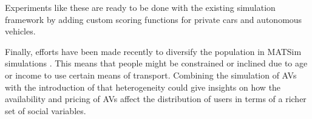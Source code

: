 Experiments like these are ready to be done with the existing simulation framework
by adding custom scoring functions for private cars and autonomous vehicles.

Finally, efforts have been made recently to diversify the population in MATSim simulations \citep{Chakirov2015}.
This means that people might be constrained or inclined due to age or income to use certain means
of transport. Combining the simulation of AVs with the introduction of that heterogeneity
could give insights on how the availability and pricing of AVs affect the distribution
of users in terms of a richer set of social variables.

